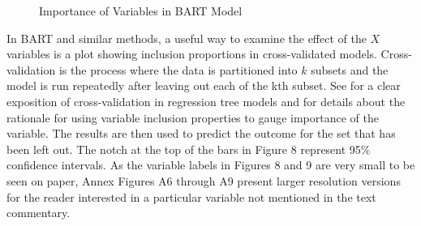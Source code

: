 \documentclass[alpha-refs,fleqn]{wiley-article_p2}
\begin{document}
\begin{group} 
\begin{figure}[htb]
\begin{subfigure}[Panel A. Mathematics Achievement]{
\texttt{[image: Fig32c.png]}}
\end{subfigure}
\begin{subfigure}[Panel B. Vocational School choice]{
\texttt{[image: cFig32c.png]}}
\end{subfigure}
\caption{Importance of Variables in BART Model}\label{fig:1}
\end{figure}
\end{group} 

In BART and similar methods, a useful way to examine the effect of the $X$ variables is a plot showing inclusion proportions in cross-validated models. Cross-validation is the process where the data is partitioned into $k$ subsets and the model is run repeatedly after leaving out each of the kth subset. See \cite{Maindonald_2006} for a clear exposition of cross-validation in regression tree models and \cite{Bleich_2014} for details about the rationale for using variable inclusion properties to gauge importance of the variable. The results are then used to predict the outcome for the set that has been left out. The notch at the top of the bars in Figure 8 represent 95\% confidence intervals. As the variable labels in Figures 8 and 9 are very small to be seen on paper, Annex Figures A6 through A9 present larger resolution versions for the reader interested in a particular variable not mentioned in the text commentary. 
\end{document}
